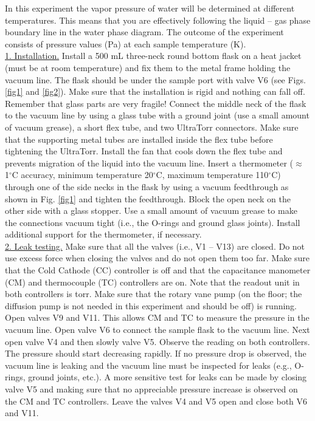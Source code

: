 \documentclass[byrevtex,amssymb,aps,pra,floatfix,letterpaper]{revtex4}
\newcommand{\degree}[0]{$^\circ$}
\begin{document}
In this experiment the vapor pressure of water will be determined at different temperatures. This means that you are effectively following the liquid -- gas phase
boundary line in the water phase diagram. The outcome of the experiment consists of pressure values (Pa) at each sample temperature (K).\\

\noindent
\underline{1. Installation.} Install a 500 mL three-neck round bottom flask on a heat jacket (must be at room temperature) and fix them to the metal frame holding the vacuum line. The flask should be under the sample port with valve V6 (see Figs. \ref{fig1} and \ref{fig2}). Make sure that the installation is rigid and nothing can fall off. Remember that glass parts are very fragile! Connect the middle neck of the flask to the vacuum line by using a glass tube with a ground joint (use a small amount of vacuum grease), a short flex tube, and two UltraTorr connectors. Make sure that the supporting metal tubes are installed inside the flex tube before tightening the UltraTorr. Install the fan that cools down the flex tube and prevents migration of the liquid into the vacuum line. Insert a thermometer ($\approx$ 1\degree C accuracy, minimum temperature 20\degree C, maximum temperature 110\degree C) through one of the side necks in the flask by using a vacuum feedthrough as shown in Fig. \ref{fig1} and tighten the feedthrough. Block the open neck on the other side with a glass stopper. Use a small amount of vacuum grease to make the connections vacuum  tight (i.e., the O-rings and ground glass joints). Install additional support for the thermometer, if necessary.\\

\noindent
\underline{2. Leak testing.} Make sure that all the valves (i.e., V1 -- V13) are closed. Do not use excess force when closing the valves and do not open them too far. Make sure that the Cold Cathode (CC) controller is off and that the capacitance manometer (CM) and thermocouple (TC) controllers are on. Note that the readout unit in both controllers is torr. Make sure that the rotary vane pump (on the floor; the diffusion pump is not needed in this experiment and should be off) is running. Open valves V9 and V11. This allows CM and TC to measure the pressure in the vacuum line. Open valve V6 to connect the sample flask to the vacuum line. Next open valve V4 and then slowly valve V5. Observe the reading on both controllers. The pressure should start decreasing rapidly. If no pressure drop is observed, the vacuum line is leaking and the vacuum line must be inspected for leaks (e.g., O-rings, ground joints, etc.). A more sensitive test for leaks can be made by closing valve V5 and making sure that no appreciable pressure increase is observed on the CM and TC controllers. Leave the valves V4 and V5 open and close both V6 and V11.\\
\end{document}
